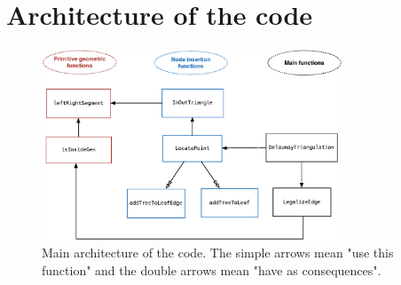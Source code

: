 \section{Architecture of the code}
\begin{figure}[h!]
\centering
\includegraphics[width=0.8\textwidth]{images/Prog.eps}
\caption{Main architecture of the code. The simple arrows mean "use this function" and the double arrows mean "have as consequences".}
\label{fig:progArchitecture}
\end{figure}

